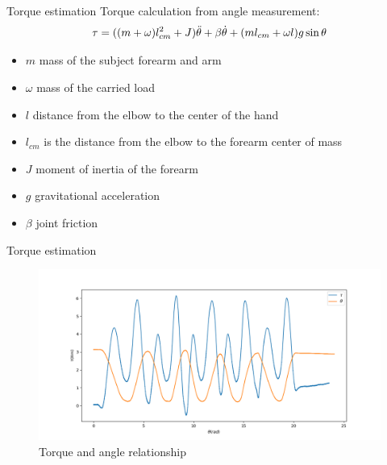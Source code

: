 \documentclass[aspectratio=169]{beamer}
\begin{document}
\begin{frame}{Torque estimation}
Torque calculation from angle measurement:
\begin{equation}
  \centering
  \tau=((m+\omega)l_{cm}^2+J)\ddot{\theta}+\beta \dot{\theta}+(ml_{cm}+\omega l)g\sin{\theta}
  \label{eq:torque}
\end{equation}
\begin{itemize}
  \item $m$ mass of the subject forearm and arm
  \item $\omega$ mass of the carried load
  \item $l$ distance from the elbow to the center of the hand
  \item $l_{cm}$ is the distance from the elbow to the forearm center of mass
  \item $J$ moment of inertia of the forearm
  \item $g$ gravitational acceleration 
  \item $\beta$ joint friction
\end{itemize}
\end{frame}

\begin{frame}{Torque estimation}
\begin{figure}[htbp]
  \centering
  \includegraphics[width=0.8\linewidth]{torque_from_angle.png}
  \caption{Torque and angle relationship}
  \label{fig:torque_from_angle}
\end{figure}
\end{frame}
\end{document}
